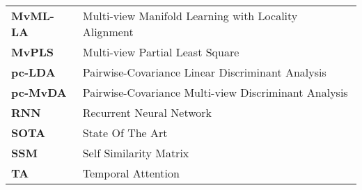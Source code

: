\begin{longtable}{p{} p{}}
    \textbf{MvML-LA} & Multi-view Manifold Learning with Locality Alignment\\
    \textbf{MvPLS} & Multi-view Partial Least Square\\
    \textbf{pc-LDA} & Pairwise-Covariance Linear Discriminant Analysis\\
    \textbf{pc-MvDA} & Pairwise-Covariance Multi-view Discriminant Analysis\\
    \textbf{RNN} & Recurrent Neural Network\\
    \textbf{SOTA} & State Of The Art\\
    \textbf{SSM} & Self Similarity Matrix\\
    \textbf{TA} & Temporal Attention\\
\end{longtable}

\resethead
